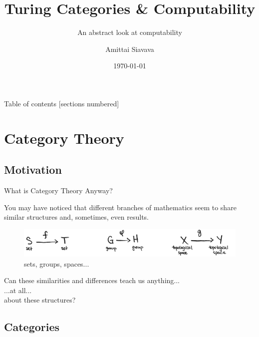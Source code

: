 \documentclass[10pt]{beamer}
\title{Turing Categories \& Computability}
\subtitle{An abstract look at computability}
\date{\today}
\author{Amittai Siavava}
\institute{Dartmouth Math 29}
\DeclareRobustCommand{\step}{\bigskip\noindent}
\begin{document}
\maketitle

\begin{frame}{Table of contents}
  [sections numbered]
  \tableofcontents%
\end{frame}

\section[Categories]{Category Theory}

\subsection{Motivation}

\begin{frame}[fragile]{What is Category Theory Anyway?}

  You may have noticed that different branches of mathematics
  seem to share similar structures and, sometimes, even results.
  

  \step
  \begin{figure}[H]
    \centering
    \includegraphics[width=\textwidth]{res/parallels.jpeg}
    \caption{sets, groups, spaces...}
  \end{figure}
  
  Can these similarities and differences teach us anything... \\
  ...at all... \\
  about these structures?
\end{frame}

\subsection{Categories}
\end{document}
